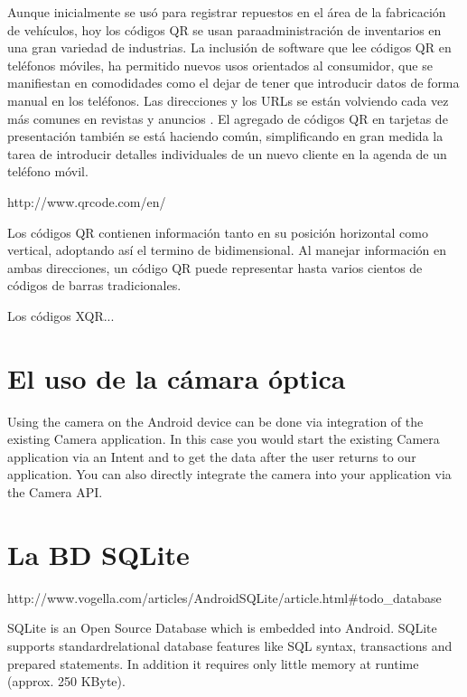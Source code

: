 Aunque inicialmente se usó para registrar repuestos en el área de la fabricación de vehículos, hoy los códigos QR se usan paraadministración de inventarios en una gran variedad de industrias. La inclusión de software que lee códigos QR en teléfonos móviles, ha permitido nuevos usos orientados al consumidor, que se manifiestan en comodidades como el dejar de tener que introducir datos de forma manual en los teléfonos. Las direcciones y los URLs se están volviendo cada vez más comunes en revistas y anuncios . El agregado de códigos QR en tarjetas de presentación también se está haciendo común, simplificando en gran medida la tarea de introducir detalles individuales de un nuevo cliente en la agenda de un teléfono móvil.

http://www.qrcode.com/en/

Los códigos QR contienen información tanto en su posición horizontal como vertical, adoptando así el termino de bidimensional. Al manejar información en ambas direcciones, un código QR puede representar hasta varios cientos de códigos de barras tradicionales.

Los códigos XQR...

\section{El uso de la c\'amara \'optica}
\label{sec:tpv.camera}

Using the camera on the Android device can be done via integration of the existing Camera application. In this case you would start the existing Camera application via an Intent and to get the data after the user returns to our application.
You can also directly integrate the camera into your application via the Camera API.

\section{La \ac{BD} SQLite}
\label{sec:tpv.bd}

http://www.vogella.com/articles/AndroidSQLite/article.html\#todo\_database


SQLite is an Open Source Database which is embedded into Android. SQLite supports standardrelational database features like SQL syntax, transactions and prepared statements. In addition it requires only little memory at runtime (approx. 250 KByte).

